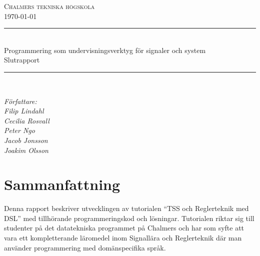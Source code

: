 \documentclass[]{article}
\date{\today}
\begin{document}
\begin{titlepage} \newcommand{\HRule}{\rule{\linewidth}{0.3mm}}
\center
\textsc{\Large Chalmers tekniska högskola}\\[0.05cm]
\normalsize \today

\HRule \\[0.08cm]
{\large  Programmering som undervisningsverktyg för signaler och system \\ \normalsize{Slutrapport}}\\[0.08cm] %
\HRule \\[0.3cm]

\vfill

\begin{flushleft} \small
    \emph{Författare: \\
    \quad Filip Lindahl\\
    \quad Cecilia Rosvall\\
    \quad Peter Ngo\\
    \quad Jacob Jonsson\\
    \quad Joakim Olsson\\}
\end{flushleft}
\end{titlepage}
\newpage
\renewcommand*\abstractname{Sammandrag}
\begin{abstract}
\end{abstract}
\newpage



\newpage
\tableofcontents

\newpage

\setlength{\parskip}{2mm}
\setlength{\parindent}{0pt}


\section{Sammanfattning}

Denna rapport beskriver utvecklingen av tutorialen “TSS och Reglerteknik med DSL” med tillhörande programmeringskod och lösningar. Tutorialen riktar sig till studenter på det datatekniska programmet på Chalmers och har som syfte att vara ett kompletterande läromedel inom Signallära och Reglerteknik där man använder programmering med domänspecifika språk.
\end{document}
